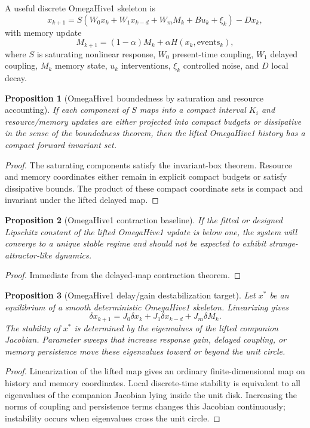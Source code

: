 \documentclass[11pt]{article}
\newtheorem{proposition}{Proposition}
\begin{document}
A useful discrete OmegaHive1 skeleton is
\[
  x_{k+1}=S\left(W_0x_k+W_1x_{k-d}+W_m M_k+B u_k+\xi_k\right)-D x_k,
\]
with memory update
\[
  M_{k+1}=(1-\alpha)M_k+\alpha H(x_k,\text{events}_k),
\]
where $S$ is saturating nonlinear response, $W_0$ present-time coupling, $W_1$
delayed coupling, $M_k$ memory state, $u_k$ interventions, $\xi_k$ controlled
noise, and $D$ local decay.

\begin{proposition}[OmegaHive1 boundedness by saturation and resource accounting]
If each component of $S$ maps into a compact interval $K_i$ and resource/memory
updates are either projected into compact budgets or dissipative in the sense of
the boundedness theorem, then the lifted OmegaHive1 history has a compact forward
invariant set.
\end{proposition}

\begin{proof}
The saturating components satisfy the invariant-box theorem.  Resource and memory
coordinates either remain in explicit compact budgets or satisfy dissipative
bounds.  The product of these compact coordinate sets is compact and invariant
under the lifted delayed map.
\end{proof}

\begin{proposition}[OmegaHive1 contraction baseline]
If the fitted or designed Lipschitz constant of the lifted OmegaHive1 update is
below one, the system will converge to a unique stable regime and should not be
expected to exhibit strange-attractor-like dynamics.
\end{proposition}

\begin{proof}
Immediate from the delayed-map contraction theorem.
\end{proof}

\begin{proposition}[OmegaHive1 delay/gain destabilization target]
Let $x^\ast$ be an equilibrium of a smooth deterministic OmegaHive1 skeleton.
Linearizing gives
\[
  \delta x_{k+1}=J_0\delta x_k+J_1\delta x_{k-d}+J_m\delta M_k.
\]
The stability of $x^\ast$ is determined by the eigenvalues of the lifted companion
Jacobian.  Parameter sweeps that increase response gain, delayed coupling, or
memory persistence move these eigenvalues toward or beyond the unit circle.
\end{proposition}

\begin{proof}
Linearization of the lifted map gives an ordinary finite-dimensional map on
history and memory coordinates.  Local discrete-time stability is equivalent to
all eigenvalues of the companion Jacobian lying inside the unit disk.  Increasing
the norms of coupling and persistence terms changes this Jacobian continuously;
instability occurs when eigenvalues cross the unit circle.
\end{proof}
\end{document}
